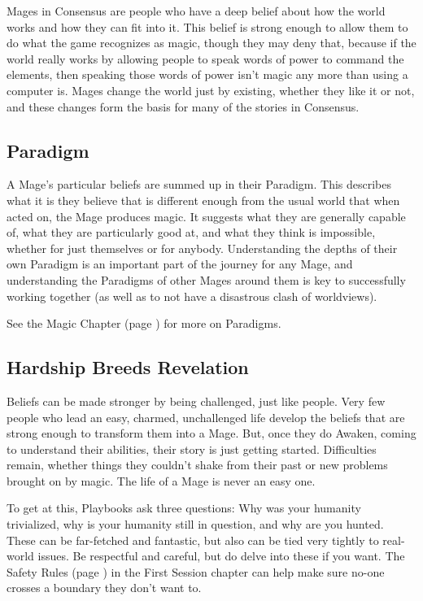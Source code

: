 \documentclass[
]{memoir}
\begin{document}
Mages in Consensus are people who have a deep belief about how the world
works and how they can fit into it. This belief is strong enough to
allow them to do what the game recognizes as magic, though they may deny
that, because if the world really works by allowing people to speak
words of power to command the elements, then speaking those words of
power isn't magic any more than using a computer is. Mages change the
world just by existing, whether they like it or not, and these changes
form the basis for many of the stories in Consensus.

\hypertarget{paradigm}{%
\subsection{Paradigm}\label{paradigm}}

A Mage's particular beliefs are summed up in their Paradigm. This
describes what it is they believe that is different enough from the
usual world that when acted on, the Mage produces magic. It suggests
what they are generally capable of, what they are particularly good at,
and what they think is impossible, whether for just themselves or for
anybody. Understanding the depths of their own Paradigm is an important
part of the journey for any Mage, and understanding the Paradigms of
other Mages around them is key to successfully working together (as well
as to not have a disastrous clash of worldviews).

See the Magic Chapter (page \pageref{Magic Chapter}) for more on Paradigms.

\hypertarget{hardship-breeds-revelation}{%
\subsection{Hardship Breeds
Revelation}\label{hardship-breeds-revelation}}

Beliefs can be made stronger by being challenged, just like people. Very
few people who lead an easy, charmed, unchallenged life develop the
beliefs that are strong enough to transform them into a Mage. But, once
they do Awaken, coming to understand their abilities, their story is
just getting started. Difficulties remain, whether things they couldn't
shake from their past or new problems brought on by magic. The life of a
Mage is never an easy one.

To get at this, Playbooks ask three questions: Why was your humanity trivialized, why is your humanity still in question, and why are you hunted. These can be far-fetched and fantastic, but also can be tied very tightly to real-world issues. Be respectful and careful, but do delve into these if you want. The Safety Rules (page \pageref{Safety Rules}) in the First Session chapter can help make sure no-one crosses a boundary they don’t want to.
\end{document}
